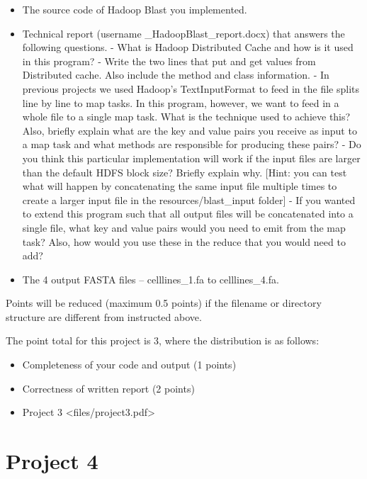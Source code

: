 \begin{itemize}
\tightlist
\item
  The source code of Hadoop Blast you implemented.
\item
  Technical report (username \_HadoopBlast\_report.docx) that answers
  the following questions. - What is Hadoop Distributed Cache and how is
  it used in this program? - Write the two lines that put and get values
  from Distributed cache. Also include the method and class information.
  - In previous projects we used Hadoop's TextInputFormat to feed in the
  file splits line by line to map tasks. In this program, however, we
  want to feed in a whole file to a single map task. What is the
  technique used to achieve this? Also, briefly explain what are the key
  and value pairs you receive as input to a map task and what methods
  are responsible for producing these pairs? - Do you think this
  particular implementation will work if the input files are larger than
  the default HDFS block size? Briefly explain why. {[}Hint: you can
  test what will happen by concatenating the same input file multiple
  times to create a larger input file in the resources/blast\_input
  folder{]} - If you wanted to extend this program such that all output
  files will be concatenated into a single file, what key and value
  pairs would you need to emit from the map task? Also, how would you
  use these in the reduce that you would need to add?
\item
  The 4 output FASTA files -- celllines\_1.fa to celllines\_4.fa.
\end{itemize}

Points will be reduced (maximum 0.5 points) if the filename or directory
structure are different from instructed above.

The point total for this project is 3, where the distribution is as
follows:

\begin{itemize}
\tightlist
\item
  Completeness of your code and output (1 points)
\item
  Correctness of written report (2 points)
\item
  Project 3 \textless{}files/project3.pdf\textgreater{}
\end{itemize}

\chapter{Project 4}\label{project-4}

